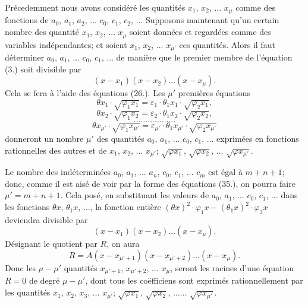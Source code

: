 \documentclass{article}
\begin{document}
Précedemment nous avons considéré les quantités $x_1$, $x_2$, $\ldots$ $x_\mu$ comme des fonctions de $a_0$, $a_1$, $a_2$, $\ldots$ $c_0$, $c_1$, $c_2$, $\ldots$ Supposons maintenant qu'un certain nombre des quantité $x_1$, $x_2$, $\ldots$ $x_\mu$ soient données et regardées comme des variables indépendantes; et soient $x_1$, $x_2$, $\ldots$ $x_{\mu'}$ ces quantités. Alors il faut déterminer $a_0$, $a_1$, $\ldots$ $c_0$, $c_1$, $\ldots$ de manière que le premier membre de l'équation (3.) soit divisible par
\[ (x-x_1)(x-x_2)\ldots(x-x_\mu). \]
Cela se fera à l'aide des équations (26.). Les $\mu'$ premières équations
\[ \theta x_1 \cdot \sqrt{\varphi_1 x_1} = \varepsilon_1 \cdot \theta_1 x_1 \cdot \sqrt{\varphi_2 x_1}, \]
\[ \theta x_2 \cdot \sqrt{\varphi_1 x_2} = \varepsilon_2 \cdot \theta_1 x_2 \cdot \sqrt{\varphi_2 x_2}, \]
\[ \ldots\ldots\ldots\ldots\ldots\ldots \]
\[ \theta x_{\mu'} \cdot \sqrt{\varphi_1 x_{\mu'}} = \varepsilon_{\mu'} \cdot \theta_1 x_{\mu'} \cdot \sqrt{\varphi_2 x_{\mu'}} \]
donneront un nombre $\mu'$ des quantités $a_0$, $a_1$, $\ldots$ $c_0$, $c_1$, $\ldots$ exprimées en fonctions rationnelles des autres et de $x_1$, $x_2$, $\ldots$ $x_{\mu'}$; $\sqrt{\varphi x_1}$, $\sqrt{\varphi x_2}$, $\ldots$ $\sqrt{\varphi x_{\mu'}}$.

Le nombre des indéterminées $a_0$, $a_1$, $\ldots$ $a_n$, $c_0$, $c_1$, $\ldots$ $c_m$ est égal à $m+n+1$; donc, comme il est aisé de voir par la forme des équations (35.), on pourra faire $\mu' = m+n+1$. Cela posé, en substituant les valeurs de $a_0$, $a_1$, $\ldots$ $c_0$, $c_1$, $\ldots$ dans les fonctions $\theta x$, $\theta_1 x$, $\ldots$, la fonction entière $(\theta x)^{2} \cdot \varphi_1 x - (\theta_1 x)^{2} \cdot \varphi_2 x$ deviendra divisible par
\[ (x-x_1)(x-x_2)\ldots(x-x_\mu). \]
Désignant le quotient par $R$, on aura
\[ R = A(x-x_{\mu'+1})(x-x_{\mu'+2})\ldots(x-x_\mu). \tag{36} \]
Donc les $\mu-\mu'$ quantités $x_{\mu'+1}$, $x_{\mu'+2}$, $\ldots$ $x_\mu$, seront les racines d'une
équation $R = 0$ de degré $\mu-\mu'$, dont tous les coëfficiens sont exprimés rationnellement par les quantités $x_1$, $x_2$, $x_3$, $\ldots$ $x_{\mu'}$; $\sqrt{\varphi x_1}$, $\sqrt{\varphi x_2}$, $\ldots\ldots$ $\sqrt{\varphi x_{\mu'}}$.
\end{document}
